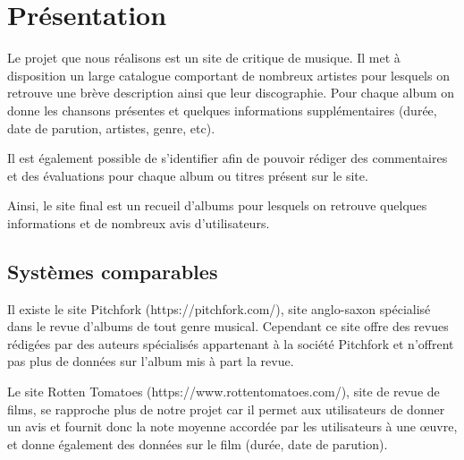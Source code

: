 \section{Présentation}

    \begin{paragraphe}
        Le projet que nous réalisons est un site de critique de musique.
        Il met à disposition un large catalogue comportant de nombreux artistes
        pour lesquels on retrouve une brève description ainsi que leur discographie.
        Pour chaque album on donne les chansons présentes et quelques informations
        supplémentaires (durée, date de parution, artistes, genre, etc).
    \end{paragraphe}

    \begin{paragraphe}
        Il est également possible de s’identifier afin de pouvoir rédiger des
        commentaires et des évaluations pour chaque album ou titres présent sur le site.
    \end{paragraphe}

    \begin{paragraphe}
        Ainsi, le site final est un recueil d’albums pour lesquels on retrouve
        quelques informations et de nombreux avis d’utilisateurs.
    \end{paragraphe}

    \subsection{Systèmes comparables}

        \begin{paragraphe}
            Il existe le site Pitchfork (https://pitchfork.com/), site anglo-saxon
            spécialisé dans le revue d’albums de tout genre musical. Cependant ce site
            offre des revues rédigées par des auteurs spécialisés appartenant à la
            société Pitchfork et n’offrent pas plus de données sur l’album mis à part
            la revue.
        \end{paragraphe}

        \begin{paragraphe}
            Le site Rotten Tomatoes (https://www.rottentomatoes.com/), site de revue de
            films, se rapproche plus de notre projet car il permet aux utilisateurs de
            donner un avis et fournit donc la note moyenne accordée par les
            utilisateurs à une œuvre, et donne également des données sur le film
            (durée, date de parution).
        \end{paragraphe}

